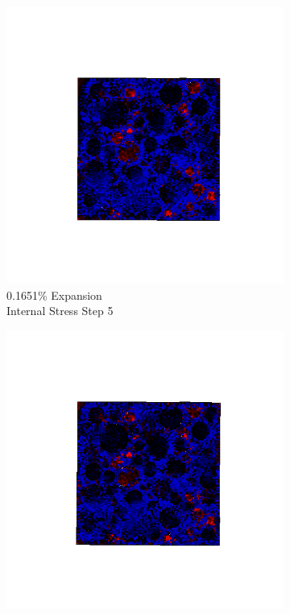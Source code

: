 \begin{figure}[ht!]
\centering
    \begin{subfigure}{.25\textwidth}
      \centering
      \includegraphics[width=1.0\linewidth]{Files/exp_3D/ASR/A30P25_1_s5.png}
      \caption{0.1651\% Expansion\\Internal Stress Step 5}
    \end{subfigure}%
    \begin{subfigure}{.25\textwidth}
      \centering
      \includegraphics[width=1.0\linewidth]{Files/exp_3D/ASR/A30P25_1_s10.png}

\end{subfigure}
\end{figure}
